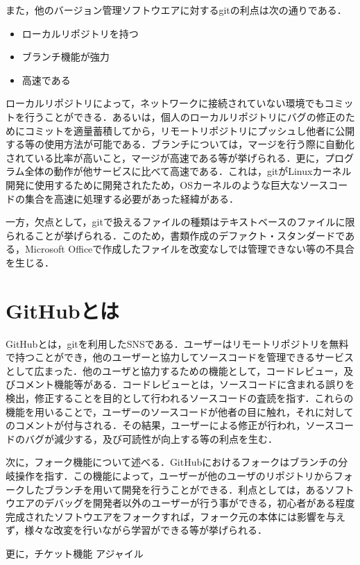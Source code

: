 \documentclass[a4paper,9pt,twocolumn]{jsarticle}
\begin{document}
また，他のバージョン管理ソフトウエアに対するgitの利点は次の通りである．

\begin{itemize}
\item ローカルリポジトリを持つ
\item ブランチ機能が強力
\item 高速である
\end{itemize}

ローカルリポジトリによって，ネットワークに接続されていない環境でもコミットを行うことができる．あるいは，個人のローカルリポジトリにバグの修正のためにコミットを適量蓄積してから，リモートリポジトリにプッシュし他者に公開する等の使用方法が可能である．ブランチについては，マージを行う際に自動化されている比率が高いこと，マージが高速である等が挙げられる．更に，プログラム全体の動作が他サービスに比べて高速である．これは，gitがLinuxカーネル開発に使用するために開発されたため，OSカーネルのような巨大なソースコードの集合を高速に処理する必要があった経緯がある．

一方，欠点として，gitで扱えるファイルの種類はテキストベースのファイルに限られることが挙げられる．このため，書類作成のデファクト・スタンダードである，Microsoft Officeで作成したファイルを改変なしでは管理できない等の不具合を生じる．

\section{GitHubとは}
GitHubとは，gitを利用したSNSである．ユーザーはリモートリポジトリを無料で持つことができ，他のユーザーと協力してソースコードを管理できるサービスとして広まった．他のユーザと協力するための機能として，コードレビュー，及びコメント機能等がある．コードレビューとは，ソースコードに含まれる誤りを検出，修正することを目的として行われるソースコードの査読を指す．これらの機能を用いることで，ユーザーのソースコードが他者の目に触れ，それに対してのコメントが付与される．その結果，ユーザーによる修正が行われ，ソースコードのバグが減少する，及び可読性が向上する等の利点を生む．

次に，フォーク機能について述べる．GitHubにおけるフォークはブランチの分岐操作を指す．この機能によって，ユーザーが他のユーザのリポジトリからフォークしたブランチを用いて開発を行うことができる．利点としては，あるソフトウエアのデバッグを開発者以外のユーザーが行う事ができる，初心者がある程度完成されたソフトウエアをフォークすれば，フォーク元の本体には影響を与えず，様々な改変を行いながら学習ができる等が挙げられる．

更に，チケット機能
アジャイル
\end{document}

